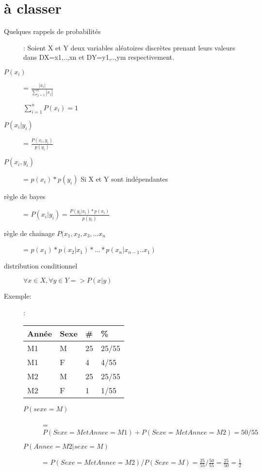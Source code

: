 \section{à classer}
\begin{description}
\item[Quelques rappels de probabilités]: Soient X et Y deux variables aléatoires discrètes prenant leurs valeurs dans DX={x1,..,xn} et DY={y1,..,ym} respectivement.  
\item[$P(x_i)$] = $\frac{|x_i|}{\sum_{j=1}^n |x_j|}$
\item[] $\sum_{i=1}^n P(x_i) = 1$
\item[$P(x_i | y_i)$] = $\frac{P(x_i,y_i)}{p(y_i)}$
\item[$P(x_i,y_i)$] = $p(x_i) * p(y_i)$ Si X et Y sont indépendantes
\item[règle de bayes] = $P(x_i|y_i) = \frac{P(y_i|x_i)*p(x_i)}{p(y_i)}$
\item[règle de chainage $P(x_1,x_2,x_3,...x_n$] = $p(x_1)*p(x_2|x_1)*...*p(x_n|x_{n-1}..x_1)$
\item[distribution conditionnel] $ \forall x \in X, \forall y \in Y => P(x|y)$
\end{description}

Exemple:
\begin{description}
\item[]: 
\begin{tabular}{ll|ll}
  \hline
  Année & Sexe & \# & \%  \\
  \hline
   M1 & M  & 25  &  25/55   \\
   M1 & F  & 4 &  4/55  \\
   M2 & M  & 25  & 25/55   \\
   M2 & F  & 1  &  1/55  \\
  \hline
\end{tabular}
\item[]
\begin{description}
\item[$P(sexe=M)$] = $P(Sexe=M et Annee=M1) + P(Sexe=M et Annee=M2) = 50/55$
\item[$P(Annee=M2 | sexe=M)$] = $P(Sexe=M et Annee=M2) / P(Sexe=M) = \frac{25}{55} / \frac{50}{55} = \frac{25}{50} = \frac{1}{2}$
\end{description}
\end{description}
\pagebreak
